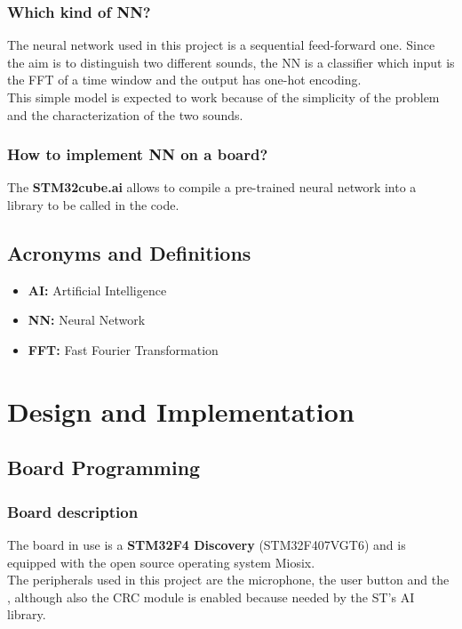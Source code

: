 \documentclass[12pt]{article}
\begin{document}
\subsubsection{Which kind of NN?}
The neural network used in this project is a sequential feed-forward one. Since the aim is to distinguish two different sounds, the NN is a classifier which input is the FFT of a time window and the output has one-hot encoding.\\
This simple model is expected to work because of the simplicity of the problem and the characterization of the two sounds.

\subsubsection{How to implement NN on a board?}
The \textbf{STM32cube.ai} allows to compile a pre-trained neural network into a library to be called in the code.

\subsection{Acronyms and Definitions}
\begin{itemize}
 \item \textbf{AI:} Artificial Intelligence
 \item \textbf{NN:} Neural Network
 \item \textbf{FFT:} Fast Fourier Transformation
\end{itemize}


\section{Design and Implementation}
\subsection{Board Programming}
\subsubsection{Board description}
The board in use is a \textbf{STM32F4 Discovery} (STM32F407VGT6) and is equipped with the open source operating system Miosix.\\
The peripherals used in this project are the microphone, the user button and the , although also the CRC module is enabled because needed by the ST's AI library.
\end{document}
